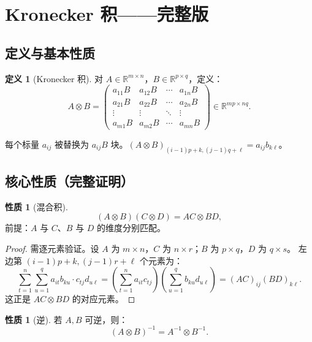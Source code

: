 \documentclass[12pt,a4paper]{ctexart}
\theoremstyle{definition}
\newtheorem{definition}{定义}[section]
\newtheorem{property}[theorem]{性质}
\theoremstyle{plain}
\newcommand{\R}{\mathbb{R}}
\begin{document}
\section{Kronecker 积——完整版}

\subsection{定义与基本性质}

\begin{definition}[Kronecker 积]
  对 $A\in\R^{m\times n}$，$B\in\R^{p\times q}$，定义：
  \[
    A\otimes B = \begin{pmatrix}
      a_{11}B & a_{12}B & \cdots & a_{1n}B \\
      a_{21}B & a_{22}B & \cdots & a_{2n}B \\
      \vdots & \vdots & \ddots & \vdots \\
      a_{m1}B & a_{m2}B & \cdots & a_{mn}B
    \end{pmatrix} \in \R^{mp\times nq}.
  \]
\end{definition}

每个标量 $a_{ij}$ 被替换为 $a_{ij}B$ 块。$(A\otimes B)_{(i-1)p+k,(j-1)q+\ell} = a_{ij}b_{k\ell}$。

\subsection{核心性质（完整证明）}

\begin{property}[混合积]\label{prop:mixed}
  \[
    (A\otimes B)(C\otimes D) = AC \otimes BD,
  \]
  前提：$A$ 与 $C$、$B$ 与 $D$ 的维度分别匹配。
\end{property}

\begin{proof}
  需逐元素验证。设 $A$ 为 $m\times n$，$C$ 为 $n\times r$；$B$ 为 $p\times q$，$D$ 为 $q\times s$。
  左边第 $(i-1)p+k,(j-1)r+\ell$ 个元素为：
  \[
    \sum_{t=1}^n\sum_{u=1}^q a_{it}b_{ku} \cdot c_{tj}d_{u\ell}
    = \left(\sum_{t=1}^n a_{it}c_{tj}\right)\left(\sum_{u=1}^q b_{ku}d_{u\ell}\right)
    = (AC)_{ij}(BD)_{k\ell}.
  \]
  这正是 $AC\otimes BD$ 的对应元素。
\end{proof}

\begin{property}[逆]
  若 $A,B$ 可逆，则：
  \begin{equation}\label{eq:kron-inv}
    (A\otimes B)^{-1} = A^{-1}\otimes B^{-1}.
  \end{equation}
\end{property}
\end{document}
